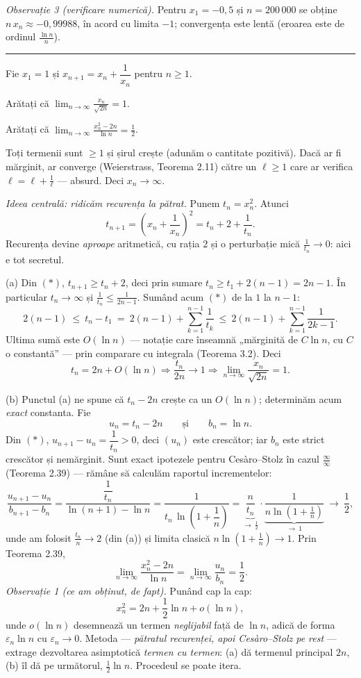 \emph{Observație 3 (verificare numerică).} Pentru $x_1=-0{,}5$ și $n=200\,000$ se obține $n\,x_n\approx-0{,}99988$, în acord cu limita $-1$; convergența este lentă (eroarea este de ordinul $\frac{\ln n}{n}$).
\vspace{1mm}\hrule

Fie $x_1=1$ și $x_{n+1}=x_n+\dfrac{1}{x_n}$ pentru $n\ge1$.
\begin{parti}
  \item Arătați că $\displaystyle\lim_{n\to\infty}\frac{x_n}{\sqrt{2n}}=1$.
  \item Arătați că $\displaystyle\lim_{n\to\infty}\frac{x_n^{2}-2n}{\ln n}=\frac12$.
\end{parti}
\sol Toți termenii sunt $\ge1$ și șirul crește (adunăm o cantitate pozitivă). Dacă ar fi mărginit, ar converge (Weierstrass, Teorema 2.11) către un $\ell\ge1$ care ar verifica $\ell=\ell+\frac1\ell$ --- absurd. Deci $x_n\to\infty$.

\emph{Ideea centrală: ridicăm recurența la pătrat.} Punem $t_n=x_n^{2}$. Atunci
\[ t_{n+1}=\left(x_n+\frac1{x_n}\right)^{\!2}=t_n+2+\frac{1}{t_n} . \tag{$\ast$} \]
Recurența devine \emph{aproape} aritmetică, cu rația $2$ și o perturbație mică $\frac1{t_n}\to0$: aici e tot secretul.

(a) Din $(\ast)$, $t_{n+1}\ge t_n+2$, deci prin sumare $t_n\ge t_1+2(n-1)=2n-1$. În particular $t_n\to\infty$ și $\frac{1}{t_n}\le\frac{1}{2n-1}$. Sumând acum $(\ast)$ de la $1$ la $n-1$:
\[ 2(n-1)\ \le\ t_n-t_1\ =\ 2(n-1)+\sum_{k=1}^{n-1}\frac{1}{t_k}\ \le\ 2(n-1)+\sum_{k=1}^{n-1}\frac{1}{2k-1} . \]
Ultima sumă este $O(\ln n)$ --- notație care înseamnă „mărginită de $C\ln n$, cu $C$ o constantă'' --- prin comparare cu integrala (Teorema 3.2). Deci
\[ t_n=2n+O(\ln n)\Longrightarrow\frac{t_n}{2n}\to1\Longrightarrow\lim_{n\to\infty}\frac{x_n}{\sqrt{2n}}=1 . \]

(b) Punctul (a) ne spune că $t_n-2n$ crește ca un $O(\ln n)$; determinăm acum \emph{exact} constanta. Fie
\[ u_n=t_n-2n \qquad\text{și}\qquad b_n=\ln n . \]
Din $(\ast)$, $u_{n+1}-u_n=\dfrac{1}{t_n}>0$, deci $(u_n)$ este crescător; iar $b_n$ este strict crescător și nemărginit. Sunt exact ipotezele pentru Cesàro--Stolz în cazul $\frac{\infty}{\infty}$ (Teorema 2.39) --- rămâne să calculăm raportul incrementelor:
\[ \frac{u_{n+1}-u_n}{b_{n+1}-b_n}=\frac{\dfrac{1}{t_n}}{\ln(n+1)-\ln n}=\frac{1}{t_n\,\ln\!\left(1+\dfrac1n\right)}=\underbrace{\frac{n}{t_n}}_{\to\ \frac12}\cdot\underbrace{\frac{1}{n\ln\!\left(1+\frac1n\right)}}_{\to\ 1}\ \longrightarrow\ \frac12 , \]
unde am folosit $\frac{t_n}{n}\to2$ (din (a)) și limita clasică $n\ln\!\left(1+\frac1n\right)\to1$. Prin Teorema 2.39,
\[ \lim_{n\to\infty}\frac{x_n^{2}-2n}{\ln n}=\lim_{n\to\infty}\frac{u_n}{b_n}=\frac12 . \]
\emph{Observație 1 (ce am obținut, de fapt).} Punând cap la cap:
\[ x_n^{2}=2n+\frac12\ln n+o(\ln n) , \]
unde $o(\ln n)$ desemnează un termen \emph{neglijabil} față de $\ln n$, adică de forma $\varepsilon_n\ln n$ cu $\varepsilon_n\to0$. Metoda --- \emph{pătratul recurenței, apoi Cesàro--Stolz pe rest} --- extrage dezvoltarea asimptotică \emph{termen cu termen}: (a) dă termenul principal $2n$, (b) îl dă pe următorul, $\frac12\ln n$. Procedeul se poate itera.

